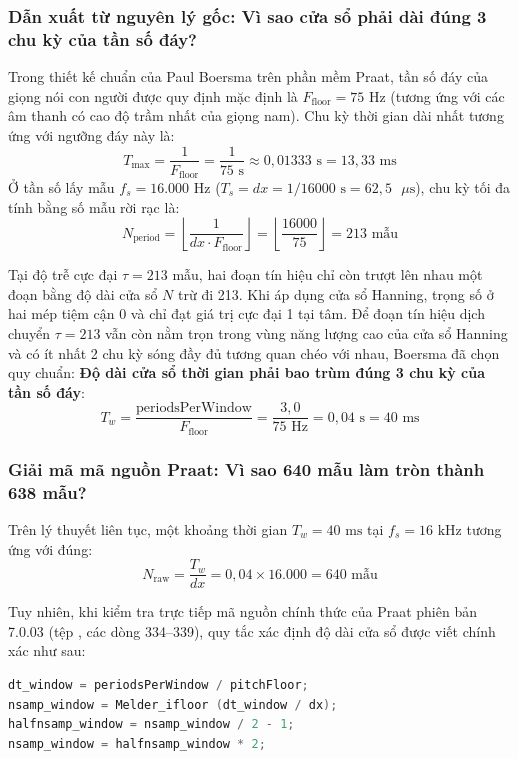 \subsubsection*{Dẫn xuất từ nguyên lý gốc: Vì sao cửa sổ phải dài đúng 3 chu kỳ của tần số đáy?}
Trong thiết kế chuẩn của Paul Boersma trên phần mềm Praat, tần số đáy của giọng nói con người được quy định mặc định là $F_{\text{floor}} = 75\text{ Hz}$ (tương ứng với các âm thanh có cao độ trầm nhất của giọng nam). Chu kỳ thời gian dài nhất tương ứng với ngưỡng đáy này là:
\begin{equation}
T_{\max} = \frac{1}{F_{\text{floor}}} = \frac{1}{75\text{ s}} \approx 0{,}01333\text{ s} = 13{,}33\text{ ms}
\end{equation}
Ở tần số lấy mẫu $f_s = 16.000\text{ Hz}$ ($T_s = dx = 1/16000\text{ s} = 62{,}5\text{ }\mu\text{s}$), chu kỳ tối đa tính bằng số mẫu rời rạc là:
\begin{equation}
N_{\text{period}} = \left\lfloor \frac{1}{dx \cdot F_{\text{floor}}} \right\rfloor = \left\lfloor \frac{16000}{75} \right\rfloor = 213\text{ mẫu}
\end{equation}

Tại độ trễ cực đại $\tau = 213$ mẫu, hai đoạn tín hiệu chỉ còn trượt lên nhau một đoạn bằng độ dài cửa sổ $N$ trừ đi 213. Khi áp dụng cửa sổ Hanning, trọng số ở hai mép tiệm cận 0 và chỉ đạt giá trị cực đại 1 tại tâm. Để đoạn tín hiệu dịch chuyển $\tau = 213$ vẫn còn nằm trọn trong vùng năng lượng cao của cửa sổ Hanning và có ít nhất 2 chu kỳ sóng đầy đủ tương quan chéo với nhau, Boersma đã chọn quy chuẩn: \textbf{Độ dài cửa sổ thời gian phải bao trùm đúng 3 chu kỳ của tần số đáy}:
\begin{equation}
T_w = \frac{\text{periodsPerWindow}}{F_{\text{floor}}} = \frac{3{,}0}{75\text{ Hz}} = 0{,}04\text{ s} = 40\text{ ms}
\end{equation}

\subsubsection*{Giải mã mã nguồn Praat: Vì sao 640 mẫu làm tròn thành 638 mẫu?}
Trên lý thuyết liên tục, một khoảng thời gian $T_w = 40\text{ ms}$ tại $f_s = 16\text{ kHz}$ tương ứng với đúng:
\begin{equation}
N_{\text{raw}} = \frac{T_w}{dx} = 0{,}04 \times 16.000 = 640\text{ mẫu}
\end{equation}

Tuy nhiên, khi kiểm tra trực tiếp mã nguồn chính thức của Praat phiên bản 7.0.03 (tệp , các dòng 334--339), quy tắc xác định độ dài cửa sổ được viết chính xác như sau:
\begin{lstlisting}[language=C, caption={Quy tắc tính kích thước cửa sổ trong Praat 7.0.03 (Sound\_to\_Pitch.cpp:334--339)}]
dt_window = periodsPerWindow / pitchFloor;
nsamp_window = Melder_ifloor (dt_window / dx);
halfnsamp_window = nsamp_window / 2 - 1;
nsamp_window = halfnsamp_window * 2;
\end{lstlisting}

